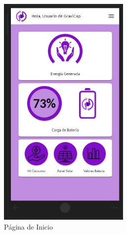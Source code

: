                 \begin{figure} [H]
                    \centering
                    \begin{subfigure}{0.4\textwidth}
                        \centering
                        \includegraphics[width=0.7\textwidth]{Aplicación/Start.png}
                        \caption{Página de Inicio}
                        \label{fig:a2.1}
                    \end{subfigure}
                    \begin{subfigure}{0.4\textwidth}
                        \centering

\end{subfigure}
\end{figure}
